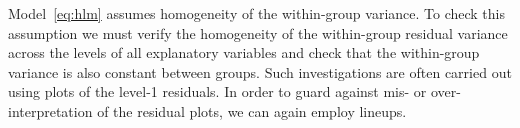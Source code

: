 \documentclass[12pt]{article}
\newcommand{\hh}[1]{{\color{orange} #1}}
\newcommand{\alnote}[1]{\todo[inline,color=green!40]{#1}} %
\newcommand{\hhnote}[1]{\todo[inline,color=orange!40]{#1}}
\begin{document}







Model~\eqref{eq:hlm} assumes homogeneity of the within-group variance. To check this assumption we must verify the homogeneity of the within-group residual variance across the levels of all explanatory variables and check that the within-group variance is also constant between groups. Such investigations are often carried out using plots of the level-1 residuals. In order to guard against mis- or over-interpretation of the residual plots, we can again employ lineups.
\end{document}
